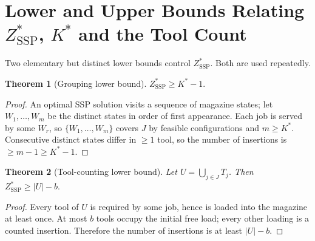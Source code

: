 \documentclass[11pt,a4paper]{article}
\theoremstyle{plain}
\newtheorem{theorem}{Theorem}[section]
\theoremstyle{definition}
\newcommand{\Kstar}{K^{*}}
\newcommand{\ZSSP}{Z_{\mathrm{SSP}}^{*}}
\begin{document}
\section{Lower and Upper Bounds Relating $\ZSSP$, $\Kstar$ and the Tool Count}
\label{sec:bounds}

Two elementary but distinct lower bounds control $\ZSSP$. Both are used repeatedly.

\begin{thmbox}
\begin{theorem}[Grouping lower bound]
\label{thm:lb_k}
$\ZSSP\ge \Kstar-1.$
\end{theorem}
\end{thmbox}
\begin{proofbox}
\begin{proof}
An optimal SSP solution visits a sequence of magazine states; let $W_1,\dots,W_m$ be the
distinct states in order of first appearance. Each job is served by some $W_r$, so
$\{W_1,\dots,W_m\}$ covers $J$ by feasible configurations and $m\ge\Kstar$. Consecutive
distinct states differ in $\ge 1$ tool, so the number of insertions is $\ge m-1\ge\Kstar-1$.
\end{proof}
\end{proofbox}

\begin{thmbox}
\begin{theorem}[Tool-counting lower bound]
\label{thm:lb_tools}
Let $U=\bigcup_{j\in J}T_j$. Then $\ZSSP\ge |U|-b.$
\end{theorem}
\end{thmbox}
\begin{proofbox}
\begin{proof}
Every tool of $U$ is required by some job, hence is loaded into the magazine at least
once. At most $b$ tools occupy the initial free load; every other loading is a counted
insertion. Therefore the number of insertions is at least $|U|-b$.
\end{proof}
\end{proofbox}
\end{document}
